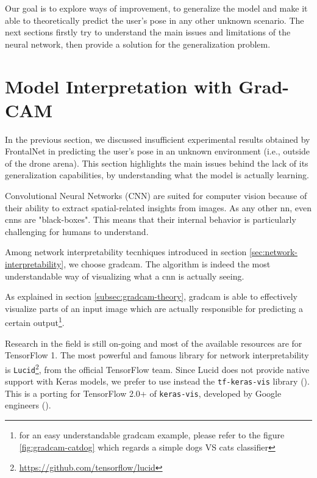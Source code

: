 \medskip

Our goal is to explore ways of improvement, to generalize the model and make it able to theoretically predict the user's pose in any other unknown scenario. The next sections firstly try to understand the main issues and limitations of the neural network, then provide a solution for the generalization problem.




\section{Model Interpretation with Grad-CAM}
\label{sec:model-interpretration}


In the previous section, we discussed insufficient experimental results obtained by FrontalNet in predicting the user's pose in an unknown environment (i.e., outside of the drone arena). This section highlights the main issues behind the lack of its generalization capabilities, by understanding what the model is actually learning.

\medskip

Convolutional Neural Networks (CNN) are suited for computer vision because of their ability to extract spatial-related insights from images. As any other \gls{nn}, even \gls{cnn}s are "black-boxes". This means that their internal behavior is particularly challenging for humans to understand.

Among network interpretability tecnhiques introduced in section \ref{sec:network-interpretability}, we choose \gls{gradcam}. The algorithm is indeed the most understandable way of visualizing what a \gls{cnn} is actually seeing.

As explained in section \ref{subsec:gradcam-theory}, \gls{gradcam} is able to effectively visualize parts of an input image which are actually responsible for predicting a certain output\footnote{for an easy understandable \gls{gradcam} example, please refer to the figure \ref{fig:gradcam-catdog} which regards a simple dogs VS cats classifier}.

\medskip

Research in the field is still on-going and most of the available resources are for TensorFlow 1. The most powerful and famous library for network interpretability is \texttt{Lucid}\footnote{\url{https://github.com/tensorflow/lucid}}, from the official TensorFlow team. Since Lucid does not provide native support with Keras models, we prefer to use instead the \texttt{tf-keras-vis} library (\cite{tf-keras-vis}). This is a porting for TensorFlow 2.0+ of \texttt{keras-vis}, developed by Google engineers (\cite{keras-vis}).



